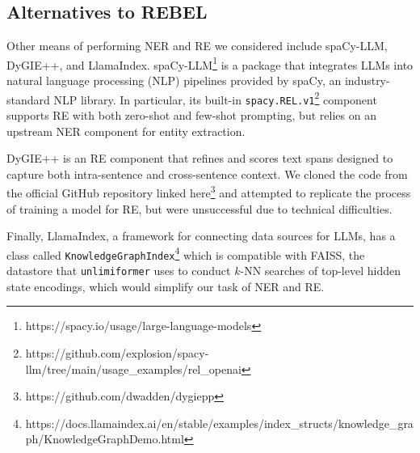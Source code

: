 \subsection*{Alternatives to REBEL}
Other means of performing NER and RE we considered include spaCy-LLM, DyGIE++, and LlamaIndex. spaCy-LLM\footnote{https://spacy.io/usage/large-language-models} is a package that integrates LLMs into natural language processing (NLP) pipelines provided by spaCy, an industry-standard NLP library. In particular, its built-in \texttt{spacy.REL.v1}\footnote{https://github.com/explosion/spacy-llm/tree/main/usage\_examples/rel\_openai} component supports RE with both zero-shot and few-shot prompting, but relies on an upstream NER component for entity extraction. 

DyGIE++ is an RE component that refines and scores text spans designed to capture both intra-sentence and cross-sentence context. We cloned the code from the official GitHub repository linked here\footnote{https://github.com/dwadden/dygiepp} and attempted to replicate the process of training a model for RE, but were unsuccessful due to technical difficulties. 

Finally, LlamaIndex, a framework for connecting data sources for LLMs, has a class called \texttt{KnowledgeGraphIndex}\footnote{https://docs.llamaindex.ai/en/stable/examples/index\_structs/knowledge\_graph/KnowledgeGraphDemo.html} which is compatible with FAISS, the datastore that \texttt{unlimiformer} uses to conduct $k$-NN searches of top-level hidden state encodings, which would simplify our task of NER and RE.